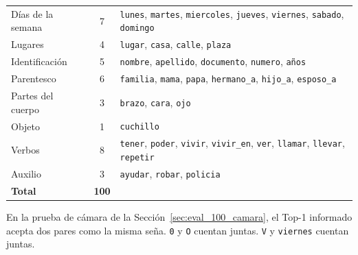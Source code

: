 \begin{table}[H]
\begin{tabularx}{\textwidth}{>{\raggedright\arraybackslash}p{4.4cm} c X}
        Días de la semana & 7 & \texttt{lunes}, \texttt{martes}, \texttt{miercoles}, \texttt{jueves}, \texttt{viernes}, \texttt{sabado}, \texttt{domingo} \\
        Lugares & 4 & \texttt{lugar}, \texttt{casa}, \texttt{calle}, \texttt{plaza} \\
        Identificación & 5 & \texttt{nombre}, \texttt{apellido}, \texttt{documento}, \texttt{numero}, \texttt{años} \\
        Parentesco & 6 & \texttt{familia}, \texttt{mama}, \texttt{papa}, \texttt{hermano\_a}, \texttt{hijo\_a}, \texttt{esposo\_a} \\
        Partes del cuerpo & 3 & \texttt{brazo}, \texttt{cara}, \texttt{ojo} \\
        Objeto & 1 & \texttt{cuchillo} \\
        Verbos & 8 & \texttt{tener}, \texttt{poder}, \texttt{vivir}, \texttt{vivir\_en}, \texttt{ver}, \texttt{llamar}, \texttt{llevar}, \texttt{repetir} \\
        Auxilio & 3 & \texttt{ayudar}, \texttt{robar}, \texttt{policia} \\
        \midrule
        \textbf{Total} & \textbf{100} & \\
        \bottomrule
    \end{tabularx}
\end{table}

En la prueba de cámara de la Sección~\ref{sec:eval_100_camara}, el Top-1 informado acepta dos pares como la misma seña. \texttt{0} y \texttt{O} cuentan juntas. \texttt{V} y \texttt{viernes} cuentan juntas.